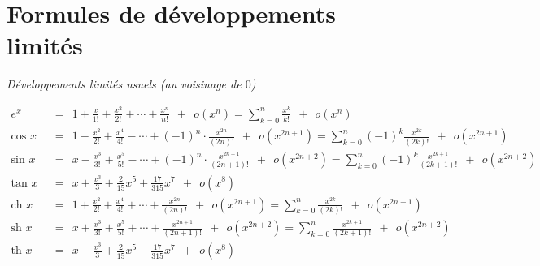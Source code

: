 \documentclass[class=report,crop=false]{standalone}
\begin{document}

\newpage
\section{Formules de développements limités}

\emph{Développements limités usuels (au voisinage de $0$)}

{\small
\begin{align*}
e^x &\ \ =\ \  1 + \frac{x}{1!}+\frac{x^2}{2!}+ \cdots + \frac{x^n}{n!}\ \  + \ \ o(x^n)
 = \sum_{k=0}^n \frac{x^k}{k!} \ \ + \ \ o(x^n)
\\[1.2em]
\text{cos } x &\ \ =\ \
1 - \frac{x^2}{2!}+\frac{x^4}{4!}- \cdots + (-1)^n \cdot \frac{x^{2n}}{(2n)!}\ \  + \ \ o(x^{2n+1})
= \sum_{k=0}^n (-1)^{k} \frac{x^{2k}}{(2k)!}  \ \  + \ \ o(x^{2n+1})
\\[0.5em]
\text{sin } x &\ \ =\ \
x - \frac{x^3}{3!}+\frac{x^5}{5!}- \cdots + (-1)^n \cdot \frac{x^{2n+1}}{(2n+1)!}\ \  + \ \ o(x^{2n+2})
= \sum_{k=0}^n (-1)^{k} \frac{x^{2k+1}}{(2k+1)!}  \ \  + \ \ o(x^{2n+2})
 \\[0.5em]
\text{tan } x &\ \ =\ \
x +  \frac{x^3}{3} + \frac{2}{15}x^5 + \frac{17}{315}x^7\ \  + \ \ o(x^{8})  \\[1.2em]
\text{ch } x &\ \ =\ \
1 + \frac{x^2}{2!}+\frac{x^4}{4!}+ \cdots + \frac{x^{2n}}{(2n)!}\ \  + \ \ o(x^{2n+1})
= \sum_{k=0}^n \frac{x^{2k}}{(2k)!} \ \  + \ \ o(x^{2n+1})
\\[0.5em]
\text{sh } x &\ \ =\ \
x + \frac{x^3}{3!}+\frac{x^5}{5!}+ \cdots + \frac{x^{2n+1}}{(2n+1)!}\ \  + \ \ o(x^{2n+2})
= \sum_{k=0}^n \frac{x^{2k+1}}{(2k+1)!} \ \  + \ \ o(x^{2n+2})
\\[0.5em]
\text{th } x &\ \ =\ \
x -  \frac{x^3}{3} + \frac{2}{15}x^5 - \frac{17}{315}x^7\ \  + \ \ o(x^{8})
\\[0.5em]
\end{align*}
}
\end{document}
